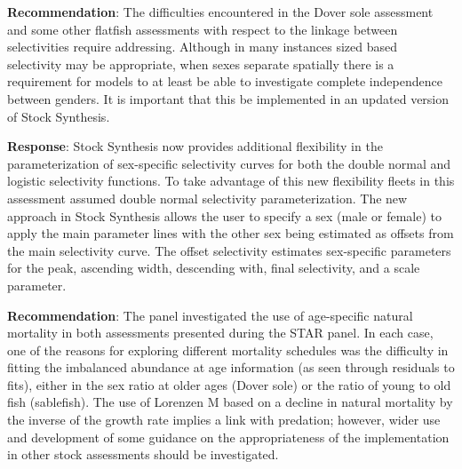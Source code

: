 \documentclass[11pt,
  english,
  a4paper,
]{article}
\begin{document}
\leavevmode\tagmcend\tagstructend\par


\textbf{Recommendation}: The difficulties encountered in the Dover sole assessment and some other flatfish assessments with respect to the linkage between selectivities require addressing. Although in many instances sized based selectivity may be appropriate, when sexes separate spatially there is a requirement for models to at least be able to investigate complete independence between genders. It is important that this be implemented in an updated version of Stock Synthesis.

\leavevmode\tagmcend\tagstructend\par


\textbf{Response}: Stock Synthesis now provides additional flexibility in the parameterization of sex-specific selectivity curves for both the double normal and logistic selectivity functions. To take advantage of this new flexibility fleets in this assessment assumed double normal selectivity parameterization. The new approach in Stock Synthesis allows the user to specify a sex (male or female) to apply the main parameter lines with the other sex being estimated as offsets from the main selectivity curve. The offset selectivity estimates sex-specific parameters for the peak, ascending width, descending with, final selectivity, and a scale parameter.

\leavevmode\tagmcend\tagstructend\par


\textbf{Recommendation}: The panel investigated the use of age-specific natural mortality in both assessments presented during the STAR panel. In each case, one of the reasons for exploring different mortality schedules was the difficulty in fitting the imbalanced abundance at age information (as seen through residuals to fits), either in the sex ratio at older ages (Dover sole) or the ratio of young to old fish (sablefish). The use of Lorenzen M based on a decline in natural mortality by the inverse of the growth rate implies a link with predation; however, wider use and development of some guidance on the appropriateness of the implementation in other stock assessments should be investigated.

\leavevmode\tagmcend\tagstructend\par
\end{document}

